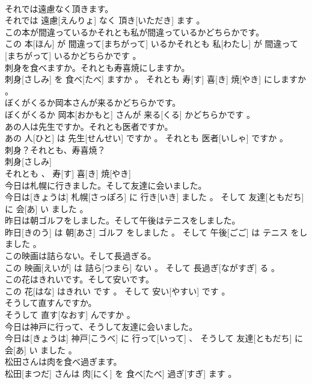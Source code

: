 \documentclass[8pt]{extreport}
\begin{document}
\begin{CJK}{UTF8}{min}
\\	それでは遠慮なく頂きます。	
\\	それでは 遠慮[えんりょ] なく 頂き[いただき] ます 。
\\	この本が間違っているかそれとも私が間違っているかどちらかです。	
\\	この 本[ほん] が 間違って[まちがって] いるかそれとも 私[わたし] が 間違って[まちがって] いるかどちらかです 。
\\	刺身を食べますか。それとも寿喜焼にしますか。	
\\	刺身[さしみ] を 食べ[たべ] ますか 。 それとも 寿[す] 喜[き] 焼[やき] にしますか 。
\\	ぼくがくるか岡本さんが来るかどちらかです。	
\\	ぼくがくるか 岡本[おかもと] さんが 来る[くる] かどちらかです 。
\\	あの人は先生ですか。それとも医者ですか。	
\\	あの 人[ひと] は 先生[せんせい] ですか 。 それとも 医者[いしゃ] ですか 。
\\	刺身？それとも、寿喜焼？	
\\	刺身[さしみ] 
\\	それとも 、 寿[す] 喜[き] 焼[やき] 
\\	今日は札幌に行きました。そして友達に会いました。	
\\	今日は[きょうは] 札幌[さっぽろ] に 行き[いき] ました 。 そして 友達[ともだち] に 会[あ] い ました 。
\\	昨日は朝ゴルフをしました。そして午後はテニスをしました。	
\\	昨日[きのう] は 朝[あさ] ゴルフ をしました 。 そして 午後[ごご] は テニス をしました 。
\\	この映画は詰らない。そして長過ぎる。	
\\	この 映画[えいが] は 詰ら[つまら] ない 。 そして 長過ぎ[ながすぎ] る 。
\\	この花はきれいです。そして安いです。	
\\	この 花[はな] はきれい です 。 そして 安い[やすい] です 。
\\	そうして直すんですか。	
\\	そうして 直す[なおす] んですか 。
\\	今日は神戸に行って、そうして友達に会いました。	
\\	今日は[きょうは] 神戸[こうべ] に 行って[いって] 、 そうして 友達[ともだち] に 会[あ] い ました 。
\\	松田さんは肉を食べ過ぎます。	
\\	松田[まつだ] さんは 肉[にく] を 食べ[たべ] 過ぎ[すぎ] ます 。

\end{CJK}
\end{document}
